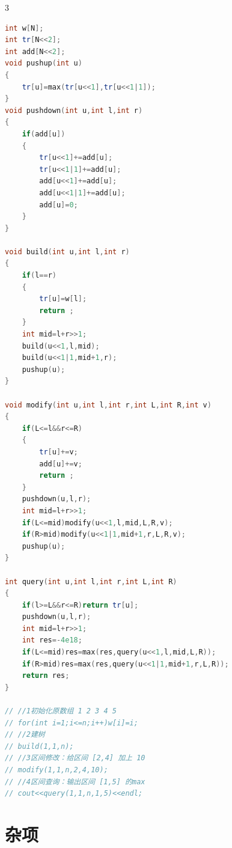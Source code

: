 \documentclass[10pt,landscape,a4paper]{article}
\begin{document}
\begin{multicols*}{3}
\begin{lstlisting}[language=C++]
int w[N];
int tr[N<<2];
int add[N<<2];
void pushup(int u)
{
    tr[u]=max(tr[u<<1],tr[u<<1|1]);
}
void pushdown(int u,int l,int r)
{
    if(add[u])
    {
        tr[u<<1]+=add[u];
        tr[u<<1|1]+=add[u];
        add[u<<1]+=add[u];
        add[u<<1|1]+=add[u];
        add[u]=0;
    }
}

void build(int u,int l,int r)
{
    if(l==r)
    {
        tr[u]=w[l];
        return ;
    }
    int mid=l+r>>1;
    build(u<<1,l,mid);
    build(u<<1|1,mid+1,r);
    pushup(u);
}

void modify(int u,int l,int r,int L,int R,int v)
{
    if(L<=l&&r<=R)
    {
        tr[u]+=v;
        add[u]+=v;
        return ;
    }
    pushdown(u,l,r);
    int mid=l+r>>1;
    if(L<=mid)modify(u<<1,l,mid,L,R,v);
    if(R>mid)modify(u<<1|1,mid+1,r,L,R,v);
    pushup(u);
}

int query(int u,int l,int r,int L,int R)
{
    if(l>=L&&r<=R)return tr[u];
    pushdown(u,l,r);
    int mid=l+r>>1;
    int res=-4e18;
    if(L<=mid)res=max(res,query(u<<1,l,mid,L,R));
    if(R>mid)res=max(res,query(u<<1|1,mid+1,r,L,R));
    return res;
}

// //1初始化原数组 1 2 3 4 5
// for(int i=1;i<=n;i++)w[i]=i;
// //2建树
// build(1,1,n);
// //3区间修改：给区间 [2,4] 加上 10
// modify(1,1,n,2,4,10);
// //4区间查询：输出区间 [1,5] 的max
// cout<<query(1,1,n,1,5)<<endl;
\end{lstlisting}
\section*{杂项}

\end{multicols*}
\end{document}
